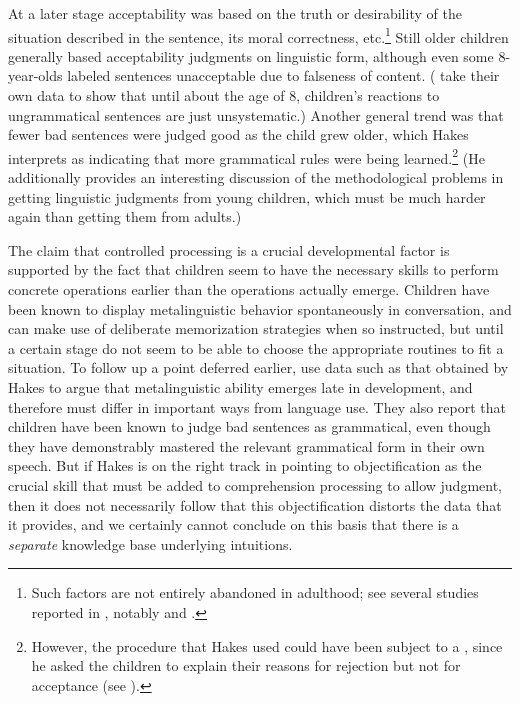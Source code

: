  At a later stage acceptability was based on the truth or desirability of the situation described in the sentence, its moral correctness, etc.\footnote{Such factors are not entirely abandoned in adulthood; see several studies reported in , notably \citet{Hill1961} and \citet{VetterEtAl1979}.}
 Still older children generally based acceptability judgments on linguistic form, although even some 8-year-olds labeled sentences unacceptable due to falseness of  content. (\citet{RyanEtAl1984} take their own data to show that until about the age of 8, children's reactions to ungrammatical sentences are just unsystematic.) Another general trend was  that fewer bad sentences were judged good as the child grew older, which Hakes interprets as indicating that more grammatical rules were being learned.\footnote{However, the procedure that Hakes used could have been subject to a , since he asked the children to explain their reasons for rejection but not for acceptance (see ).}
(He additionally provides an interesting discussion of the methodological problems in getting linguistic judgments from young children, which must be much harder again than getting them from adults.)

The claim that controlled processing is a crucial developmental factor is supported by the fact that children seem to have the necessary skills to perform concrete operations earlier than the operations actually  emerge.  Children  have been known to display metalinguistic behavior  spontaneously  in  conversation, and can make use of deliberate memorization strategies when so instructed, but until a certain stage do not seem to be able to choose the appropriate routines to fit a situation. To follow up a point deferred earlier, \citeauthor{HirshPasekEtAl1978} use data such as that obtained by Hakes to argue that metalinguistic ability emerges late in development, and therefore must differ in important ways from language use. They also report that children have been known to judge bad sentences as grammatical, even though they have demonstrably mastered the relevant grammatical form in their own speech. But if Hakes is on the right track in pointing
to objectification as the crucial skill that must be added to comprehension processing to allow judgment, then it does not necessarily follow that this objectification distorts the data that it provides, and we certainly cannot conclude on this basis that there is a \textit{separate} knowledge base underlying intuitions.

